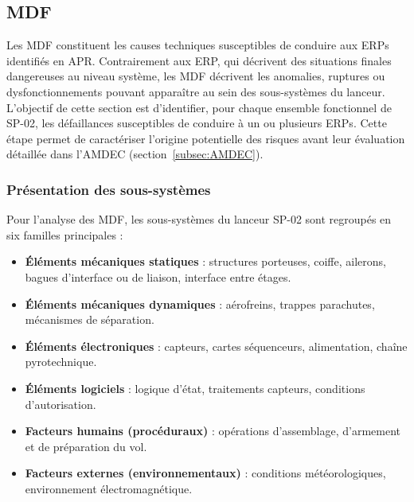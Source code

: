 \subsection{\acrlong{MDF}}
\label{subsec:modes_deffaillance}


Les \acrfull{MDF} constituent les causes techniques susceptibles de conduire aux \acrshort{ERPs} identifiés en
\acrlong{APR}. Contrairement aux \acrshort{ERP}, qui décrivent des situations finales dangereuses au niveau système, les
\acrlong{MDF} décrivent les anomalies, ruptures ou dysfonctionnements pouvant apparaître au sein des sous-systèmes du lanceur.\\

L’objectif de cette section est d’identifier, pour chaque ensemble fonctionnel de SP-02, les défaillances susceptibles
de conduire à un ou plusieurs \acrshort{ERPs}. Cette étape permet de caractériser l’origine potentielle des risques avant leur
évaluation détaillée dans l’\acrshort{AMDEC} (section~\ref{subsec:AMDEC}).

\subsubsection{Présentation des sous-systèmes}
\label{subsubsec:sous_sys}

Pour l’analyse des \acrshort{MDF}, les sous-systèmes du lanceur SP-02 sont regroupés en six familles principales :\\
\begin{itemize}
    \item \textbf{Éléments mécaniques statiques} : structures porteuses, coiffe, ailerons, bagues d’interface ou de liaison,
    interface entre étages.
    \item \textbf{Éléments mécaniques dynamiques} : aérofreins, trappes parachutes, mécanismes de séparation.
    \item \textbf{Éléments électroniques} : capteurs, cartes séquenceurs, alimentation, chaîne pyrotechnique.
    \item \textbf{Éléments logiciels} : logique d’état, traitements capteurs, conditions d’autorisation.
    \item \textbf{Facteurs humains (procéduraux)} : opérations d’assemblage, d’armement et de préparation du vol.
    \item \textbf{Facteurs externes (environnementaux)} : conditions météorologiques, environnement électromagnétique.\\
\end{itemize}

